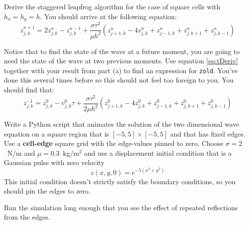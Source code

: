 
\begin{enumerate}
\probtwo \label{P:15.2}
\begin{enumerate}
\subprob Derive the staggered leapfrog algorithm for the case
    of square cells with $h_x = h_y = h$. You should arrive at the
    following equation:
\begin{equation}
z_{j,k}^{n+1} = 2 z_{j,k}^n - z_{j,k}^{n-1} + \frac{\sigma \tau^2}{\mu
h^2} \left( z_{j+1,k}^n - 4 z_{j,k}^n + z_{j-1,k}^n + z_{j,k+1}^n + z_{j,k-1}^n\right)
\end{equation}

\subprob Notice that to find the state of the wave at a future moment,
you are going to need the state of the wave at two previous moments.
Use equation \eqref{eq:tDeriv} together with your result from part (a)
to find an expression for \texttt{zold}. You've done this several
times before so this should not feel too foreign to you. You should
find that:
\begin{equation}
z_{j,k}^{-1} = z_{j,k}^0 - v_{j,k}^0 \tau + \frac{\sigma \tau^2}{2\mu
h^2} \left( z_{j+1,k}^0 - 4 z_{j,k}^0 + z_{j-1,k}^0 + z_{j,k+1}^0 + z_{j,k-1}^0\right)
\end{equation}

\subprob Write a Python script that animates the solution of the two
dimensional wave equation on a square region that is
$[-5,5]\times[-5,5]$ and that has fixed edges. Use a
\textbf{cell-edge} square grid with the edge-values pinned to
zero. Choose $\sigma=2$~N/m and $\mu=0.3$~kg/m$^2$ and use a
displacement initial condition that is a Gaussian pulse with zero
velocity
    \begin{equation}
        z(x,y,0) = e^{-5(x^2+y^2)}
        \label{sheetpulse}
    \end{equation}
    This initial condition doesn't strictly satisfy the
    boundary conditions, so you should pin the edges to zero.

    Run the simulation long enough that you see the effect of
    repeated reflections from the edges.  


\end{enumerate}
\end{enumerate}
